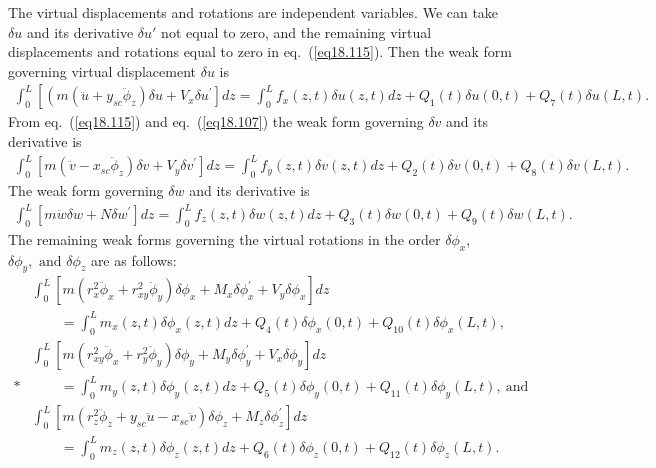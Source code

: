 \documentclass{AeroStructure-ERJohnson}
\begin{document}
The virtual displacements and rotations are independent variables. We can take $\delta u$ and its derivative $\delta u'$ not equal to zero, and the remaining virtual displacements and rotations equal to zero in eq.~(\ref{eq18.115}). Then the weak form governing virtual displacement $\delta u$ is
\begin{align}\label{eq18.116}
\int_{0}^{L}\left[\left(m\left(\ddot{u}+y_{s c} \ddot{\phi}_{z}\right) \delta u+V_{x} \delta u^{\prime}\right] d z=\int_{0}^{L} f_{x}(z, t) \delta u(z, t) d z+Q_{1}(t) \delta u(0, t)+Q_{7}(t) \delta u(L, t)\right.\!.
\end{align}
From eq.~(\ref{eq18.115}) and eq.~(\ref{eq18.107}) the weak form governing $\delta v$ and its derivative is
\begin{align}\label{eq18.117}
\int_{0}^{L}\left[m\left(\ddot{v}-x_{s c} \ddot{\phi}_{z}\right) \delta v+V_{y} \delta v^{\prime}\right] d z=\int_{0}^{L} f_{y}(z, t) \delta v(z, t) d z+Q_{2}(t) \delta v(0, t)+Q_{8}(t) \delta v(L, t).
\end{align}
The weak form governing $\delta w$ and its derivative is
\begin{align}\label{eq18.118}
\int_{0}^{L}\left[m \ddot{w} \delta w+N \delta w^{\prime}\right] d z=\int_{0}^{L} f_{z}(z, t) \delta w(z, t) d z+Q_{3}(t) \delta w(0, t)+Q_{9}(t) \delta w(L, t).
\end{align}
The remaining weak forms governing the virtual rotations in the order $\delta \phi_{x}$, $\delta \phi_{y},\text{ and }\delta \phi_{z}$ are as follows:
\begin{align}
&\int_{0}^{L}\left[m\left(r_{x}^{2} \ddot{\phi}_{x}+r_{x y}^{2} \ddot{\phi}_{y}\right) \delta \phi_{x}+M_{x} \delta \phi_{x}^{\prime}+V_{y} \delta \phi_{x}\right] d z\nonumber\\
&\qquad=\int_{0}^{L} m_{x}(z, t) \delta \phi_{x}(z, t) d z+Q_{4}(t) \delta \phi_{x}(0, t)+Q_{10}(t) \delta \phi_{x}(L, t),\label{eq18.119}\\
&\int_{0}^{L}\left[m\left(r_{x y}^{2} \ddot{\phi}_{x}+r_{y}^{2} \ddot{\phi}_{y}\right) \delta \phi_{y}+M_{y} \delta \phi_{y}^{\prime}+V_{x} \delta \phi_{y}\right] d z\nonumber\\*
&\qquad=\int_{0}^{L} m_{y}(z, t) \delta \phi_{y}(z, t) d z+Q_{5}(t) \delta \phi_{y}(0, t)+Q_{11}(t) \delta \phi_{y}(L, t),\ \text{and}\label{eq18.120}\\
&\int_{0}^{L}\left[m\left(r_{z}^{2} \ddot{\phi}_{z}+y_{s c} \ddot{u}-x_{s c} \ddot{v}\right) \delta \phi_{z}+M_{z} \delta \phi_{z}^{\prime}\right] d z\nonumber\\
&\qquad=\int_{0}^{L} m_{z}(z, t) \delta \phi_{z}(z, t) d z+Q_{6}(t) \delta \phi_{z}(0, t)+Q_{12}(t) \delta \phi_{z}(L, t).\label{eq18.121}
\end{align}
\end{document}
